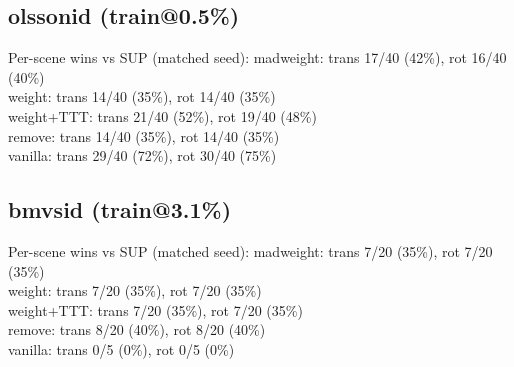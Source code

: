 \documentclass[10pt]{article}
\begin{document}
\subsection*{olssonid (train@0.5\%)}
\begin{center}\end{center}
Per-scene wins vs SUP (matched seed):
\indent madweight: trans 17/40 (42\%), rot 16/40 (40\%)\\
\indent weight: trans 14/40 (35\%), rot 14/40 (35\%)\\
\indent weight+TTT: trans 21/40 (52\%), rot 19/40 (48\%)\\
\indent remove: trans 14/40 (35\%), rot 14/40 (35\%)\\
\indent vanilla: trans 29/40 (72\%), rot 30/40 (75\%)\\
\subsection*{bmvsid (train@3.1\%)}
\begin{center}\end{center}
Per-scene wins vs SUP (matched seed):
\indent madweight: trans 7/20 (35\%), rot 7/20 (35\%)\\
\indent weight: trans 7/20 (35\%), rot 7/20 (35\%)\\
\indent weight+TTT: trans 7/20 (35\%), rot 7/20 (35\%)\\
\indent remove: trans 8/20 (40\%), rot 8/20 (40\%)\\
\indent vanilla: trans 0/5 (0\%), rot 0/5 (0\%)\\
\end{document}
